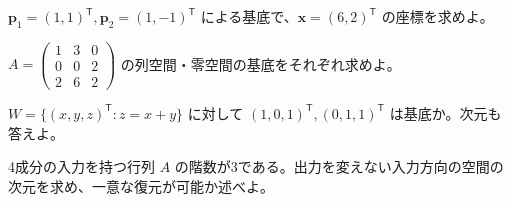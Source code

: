 \documentclass[11pt]{article}
\begin{document}

\problem[基底座標]
$\boldsymbol p_1=(1,1)^{\mathsf T},\boldsymbol p_2=(1,-1)^{\mathsf T}$ による基底で、$\boldsymbol x=(6,2)^{\mathsf T}$ の座標を求めよ。
\workspace{38mm}

\problem[列空間と零空間]
$A=\begin{pmatrix}1&3&0\\0&0&2\\2&6&2\end{pmatrix}$ の列空間・零空間の基底をそれぞれ求めよ。
\workspace{38mm}
\newpage

\problem[基底の判定]
$W=\{(x,y,z)^{\mathsf T}:z=x+y\}$ に対して $(1,0,1)^{\mathsf T},(0,1,1)^{\mathsf T}$ は基底か。次元も答えよ。
\workspace{38mm}

\problem[測定の自由度]
4成分の入力を持つ行列 $A$ の階数が3である。出力を変えない入力方向の空間の次元を求め、一意な復元が可能か述べよ。
\workspace{38mm}
\end{document}
